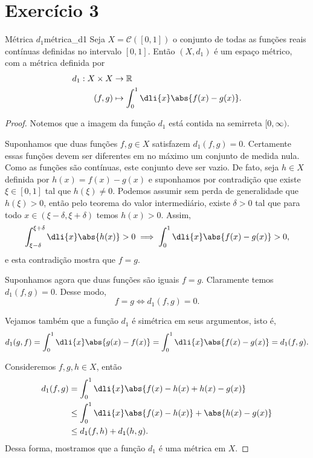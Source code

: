\section*{Exercício 3}
\begin{proposition}{Métrica \(d_1\)}{métrica_d1}
    Seja \(X = \mathcal{C}([0,1])\) o conjunto de todas as funções reais contínuas definidas no intervalo \([0,1]\). Então \((X, d_1)\) é um espaço métrico, com a métrica definida por
    \begin{align*}
        d_1 : X \times X &\to \mathbb{R}\\
        (f,g) &\mapsto \int_0^1 \dli{x} \abs{f(x) - g(x)}.
    \end{align*}
\end{proposition}
\begin{proof}
    Notemos que a imagem da função \(d_1\) está contida na semirreta \([0,\infty)\).

    Suponhamos que duas funções \(f,g \in X\) satisfazem \(d_1(f,g)=0\). Certamente essas funções devem ser diferentes em no máximo um conjunto de medida nula. Como as funções são contínuas, este conjunto deve ser vazio. De fato, seja \(h \in X\) definida por \(h(x) = f(x) - g(x)\) e suponhamos por contradição que existe \(\xi \in [0,1]\) tal que \(h(\xi) \neq 0\). Podemos assumir sem perda de generalidade que \(h(\xi) > 0\), então pelo teorema do valor intermediário, existe \(\delta > 0\) tal que para todo \(x \in (\xi - \delta, \xi + \delta)\) temos \(h(x) > 0\). Assim,
    \begin{equation*}
        \int_{\xi-\delta}^{\xi+\delta}\dli{x} \abs{h(x)} > 0 \implies \int_0^1 \dli{x} \abs{f(x) - g(x)} > 0,
    \end{equation*}
    e esta contradição mostra que \(f = g\).

    Suponhamos agora que duas funções são iguais \(f = g\). Claramente temos \(d_1(f,g) = 0\). Desse modo,
    \begin{equation*}
        f = g \iff d_1(f,g) = 0.
    \end{equation*}

    Vejamos também que a função \(d_1\) é simétrica em seus argumentos, isto é,
    \begin{equation*}
        d_1(g,f) = \int_0^1 \dli{x} \abs{g(x) - f(x)} = \int_0^1 \dli{x} \abs{f(x) - g(x)} = d_1(f,g).
    \end{equation*}

    Consideremos \(f,g,h \in X\), então
    \begin{align*}
        d_1(f,g) &= \int_0^1 \dli{x} \abs{f(x) - h(x) + h(x) - g(x)}\\
                 &\leq \int_0^1 \dli{x} \abs{f(x) - h(x)} + \abs{h(x) - g(x)}\\
                 &\leq d_1(f,h) + d_1(h,g).
    \end{align*}
    Dessa forma, mostramos que a função \(d_1\) é uma métrica em \(X\).
\end{proof}
